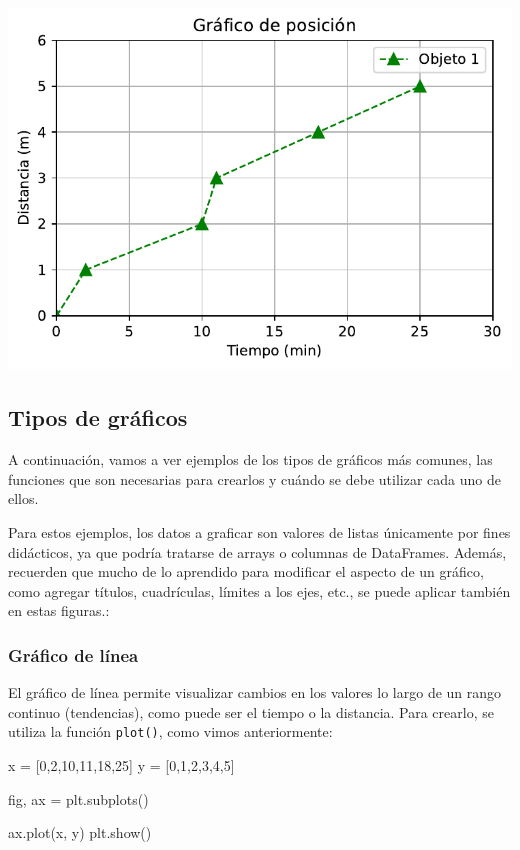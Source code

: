 \documentclass[
  letterpaper,
  DIV=11,
  numbers=noendperiod]{scrreprt}
\newenvironment{Shaded}{\begin{snugshade}}{\end{snugshade}}
\newcommand{\DecValTok}[1]{\textcolor[rgb]{0.68,0.00,0.00}{#1}}
\newcommand{\NormalTok}[1]{\textcolor[rgb]{0.00,0.23,0.31}{#1}}
\newcommand{\OperatorTok}[1]{\textcolor[rgb]{0.37,0.37,0.37}{#1}}
\begin{document}
\includegraphics{unidad_6_files/figure-pdf/cell-116-output-1.pdf}

\subsection{Tipos de gráficos}\label{tipos-de-gruxe1ficos}

A continuación, vamos a ver ejemplos de los tipos de gráficos más
comunes, las funciones que son necesarias para crearlos y cuándo se debe
utilizar cada uno de ellos.

Para estos ejemplos, los datos a graficar son valores de listas
únicamente por fines didácticos, ya que podría tratarse de arrays o
columnas de DataFrames. Además, recuerden que mucho de lo aprendido para
modificar el aspecto de un gráfico, como agregar títulos, cuadrículas,
límites a los ejes, etc., se puede aplicar también en estas figuras.:

\subsubsection{Gráfico de línea}\label{gruxe1fico-de-luxednea}

El gráfico de línea permite visualizar cambios en los valores lo largo
de un rango continuo (tendencias), como puede ser el tiempo o la
distancia. Para crearlo, se utiliza la función \texttt{plot()}, como
vimos anteriormente:

\begin{Shaded}
\begin{Highlighting}[]
\NormalTok{x }\OperatorTok{=}\NormalTok{ [}\DecValTok{0}\NormalTok{,}\DecValTok{2}\NormalTok{,}\DecValTok{10}\NormalTok{,}\DecValTok{11}\NormalTok{,}\DecValTok{18}\NormalTok{,}\DecValTok{25}\NormalTok{]}
\NormalTok{y }\OperatorTok{=}\NormalTok{ [}\DecValTok{0}\NormalTok{,}\DecValTok{1}\NormalTok{,}\DecValTok{2}\NormalTok{,}\DecValTok{3}\NormalTok{,}\DecValTok{4}\NormalTok{,}\DecValTok{5}\NormalTok{]}

\NormalTok{fig, ax }\OperatorTok{=}\NormalTok{ plt.subplots()}

\NormalTok{ax.plot(x, y)}
\NormalTok{plt.show()}
\end{Highlighting}
\end{Shaded}
\end{document}
